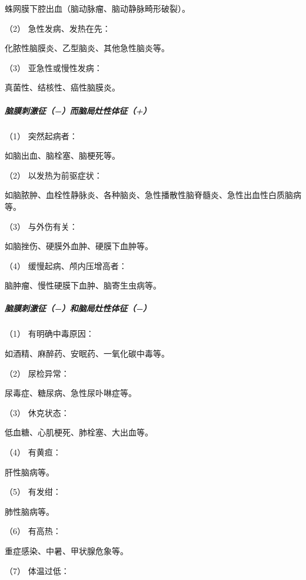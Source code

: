 蛛网膜下腔出血（脑动脉瘤、脑动静脉畸形破裂）。

\hypertarget{text00010.htmlux5cux23CHP1-2-2-4-2-1-2}{}
（2） 急性发病、发热在先：

化脓性脑膜炎、乙型脑炎、其他急性脑炎等。

\hypertarget{text00010.htmlux5cux23CHP1-2-2-4-2-1-3}{}
（3） 亚急性或慢性发病：

真菌性、结核性、癌性脑膜炎。

\subparagraph{脑膜刺激征（−）而脑局灶性体征（+）}

\hypertarget{text00010.htmlux5cux23CHP1-2-2-4-2-2-1}{}
（1） 突然起病者：

如脑出血、脑栓塞、脑梗死等。

\hypertarget{text00010.htmlux5cux23CHP1-2-2-4-2-2-2}{}
（2） 以发热为前驱症状：

如脑脓肿、血栓性静脉炎、各种脑炎、急性播散性脑脊髓炎、急性出血性白质脑病等。

\hypertarget{text00010.htmlux5cux23CHP1-2-2-4-2-2-3}{}
（3） 与外伤有关：

如脑挫伤、硬膜外血肿、硬膜下血肿等。

\hypertarget{text00010.htmlux5cux23CHP1-2-2-4-2-2-4}{}
（4） 缓慢起病、颅内压增高者：

脑肿瘤、慢性硬膜下血肿、脑寄生虫病等。

\subparagraph{脑膜刺激征（−）和脑局灶性体征（−）}

\hypertarget{text00010.htmlux5cux23CHP1-2-2-4-2-3-1}{}
（1） 有明确中毒原因：

如酒精、麻醉药、安眠药、一氧化碳中毒等。

\hypertarget{text00010.htmlux5cux23CHP1-2-2-4-2-3-2}{}
（2） 尿检异常：

尿毒症、糖尿病、急性尿卟啉症等。

\hypertarget{text00010.htmlux5cux23CHP1-2-2-4-2-3-3}{}
（3） 休克状态：

低血糖、心肌梗死、肺栓塞、大出血等。

\hypertarget{text00010.htmlux5cux23CHP1-2-2-4-2-3-4}{}
（4） 有黄疸：

肝性脑病等。

\hypertarget{text00010.htmlux5cux23CHP1-2-2-4-2-3-5}{}
（5） 有发绀：

肺性脑病等。

\hypertarget{text00010.htmlux5cux23CHP1-2-2-4-2-3-6}{}
（6） 有高热：

重症感染、中暑、甲状腺危象等。

\hypertarget{text00010.htmlux5cux23CHP1-2-2-4-2-3-7}{}
（7） 体温过低：

